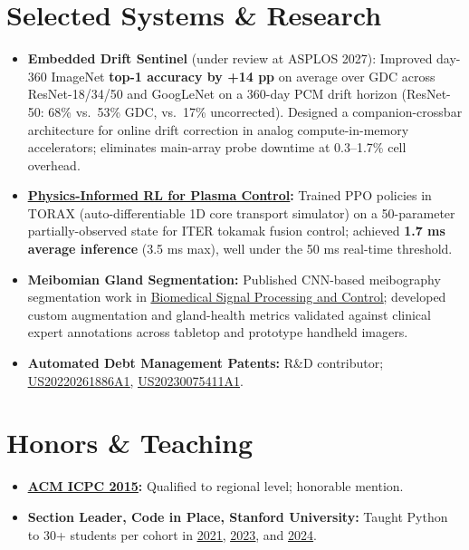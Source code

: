 \documentclass[letterpaper, 11pt]{article}
\let\oldhref\href
\renewcommand{\href}[2]{\oldhref{#1}{\uline{#2}}}
\begin{document}
\section{Selected Systems \& Research}
\begin{itemize}[leftmargin=0pt, label={}]
  \item{\textbf{Embedded Drift Sentinel} (under review at ASPLOS 2027): Improved day-360 ImageNet \textbf{top-1 accuracy by +14 pp} on average over GDC across ResNet-18/34/50 and GoogLeNet on a 360-day PCM drift horizon (ResNet-50: 68\% vs.\ 53\% GDC, vs.\ 17\% uncorrected). Designed a companion-crossbar architecture for online drift correction in analog compute-in-memory accelerators; eliminates main-array probe downtime at 0.3--1.7\% cell overhead.}
  \item{\textbf{\href{https://files.knhash.in/PIRLforPlasma.pdf}{Physics-Informed RL for Plasma Control}:} Trained PPO policies in TORAX (auto-differentiable 1D core transport simulator) on a 50-parameter partially-observed state for ITER tokamak fusion control; achieved \textbf{1.7 ms average inference} (3.5 ms max), well under the 50 ms real-time threshold.}
  \item{\textbf{Meibomian Gland Segmentation:} Published CNN-based meibography segmentation work in \href{https://www.sciencedirect.com/science/article/abs/pii/S174680941930357X}{Biomedical Signal Processing and Control}; developed custom augmentation and gland-health metrics validated against clinical expert annotations across tabletop and prototype handheld imagers.}
  \item{\textbf{Automated Debt Management Patents:} R\&D contributor; \href{https://patents.google.com/patent/US20220261886A1}{US20220261886A1}, \href{https://patents.google.com/patent/US20230075411A1/}{US20230075411A1}.}
\end{itemize}

\section{Honors \& Teaching}
\begin{itemize}[leftmargin=0pt, label={}]
  \item{\textbf{\href{https://files.knhash.in/ICPC_2015.pdf}{ACM ICPC 2015}:} Qualified to regional level; honorable mention.}
  \item{\textbf{Section Leader, Code in Place, Stanford University:} Taught Python to 30+ students per cohort in \href{https://files.knhash.in/CodeInPlace.pdf}{2021}, \href{https://files.knhash.in/CodeInPlace2023.pdf}{2023}, and \href{https://files.knhash.in/CodeInPlace2024.pdf}{2024}.}
\end{itemize}
\end{document}
